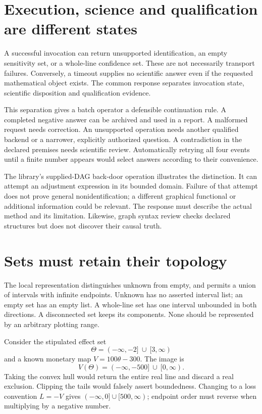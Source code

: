 \section{Execution, science and qualification are different states}

A successful invocation can return unsupported identification, an empty
sensitivity set, or a whole-line confidence set. These are not necessarily
transport failures. Conversely, a timeout supplies no scientific answer even
if the requested mathematical object exists. The common response separates
invocation state, scientific disposition and qualification evidence.

This separation gives a batch operator a defensible continuation rule. A
completed negative answer can be archived and used in a report. A malformed
request needs correction. An unsupported operation needs another qualified
backend or a narrower, explicitly authorized question. A contradiction in the
declared premises needs scientific review. Automatically retrying all four
events until a finite number appears would select answers according to their
convenience.

The library's supplied-DAG back-door operation illustrates the distinction.
It can attempt an adjustment expression in its bounded domain. Failure of
that attempt does not prove general nonidentification; a different graphical
functional or additional information could be relevant. The response must
describe the actual method and its limitation. Likewise, graph syntax review
checks declared structures but does not discover their causal truth.
\cite{v12_in_runtime}

\section{Sets must retain their topology}

The local representation distinguishes unknown from empty, and permits a union
of intervals with infinite endpoints. Unknown has no asserted interval list;
an empty set has an empty list. A whole-line set has one interval unbounded in
both directions. A disconnected set keeps its components.\cite{v12_in_contract}
None should be represented by an arbitrary plotting range.

Consider the stipulated effect set
\[
 \Theta=(-\infty,-2]\ \cup\ [3,\infty)
\]
and a known monetary map $V=100\theta-300$. The image is
\[
 V(\Theta)=(-\infty,-500]\ \cup\ [0,\infty).
\]
Taking the convex hull would return the entire real line and discard a real
exclusion. Clipping the tails would falsely assert boundedness. Changing to a
loss convention $L=-V$ gives $(-\infty,0]\cup[500,\infty)$; endpoint order must
reverse when multiplying by a negative number.

